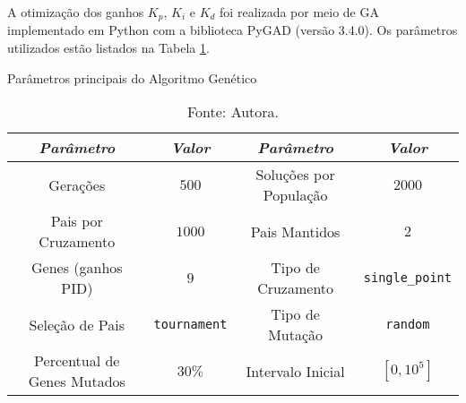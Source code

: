 \vspace{-1.5cm}


A otimização dos ganhos $K_p$, $K_i$ e $K_d$ foi realizada por meio de GA implementado em Python 
com a biblioteca PyGAD (versão 3.4.0). Os parâmetros utilizados estão listados na Tabela 
\ref{tab:ga_params_summary}.
\vspace{-0.2cm}
\begin{table}[h!]
    \centering
    \caption{Parâmetros principais do Algoritmo Genético} \vspace{-0.3cm}
    \begin{tabular}{|c|c||c|c|}
        \hline
        \emph{Parâmetro} & \emph{Valor} & \emph{Parâmetro} & \emph{Valor} \\
        \hline
        Gerações & $500$ & Soluções por População & $2000$ \\
        \hline
        Pais por Cruzamento & $1000$ & Pais Mantidos & $2$ \\
        \hline
        Genes (ganhos PID) & $9$ & Tipo de Cruzamento & \texttt{single\_point} \\
        \hline
        Seleção de Pais & \texttt{tournament} & Tipo de Mutação & \texttt{random} \\
        \hline
        Percentual de Genes Mutados & $30\%$ & Intervalo Inicial & $[0, 10^5]$ \\
        \hline
    \end{tabular}
    \caption*{\footnotesize{Fonte: Autora.}} \vspace{-0.55cm}
    \label{tab:ga_params_summary}
\end{table}

